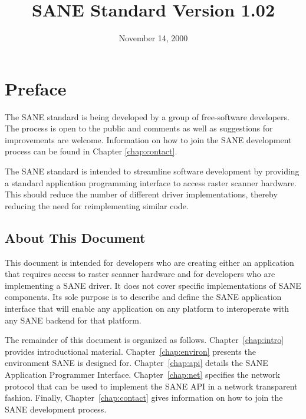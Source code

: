 \documentclass[11pt,DVIps]{report}
\title{\huge SANE Standard Version 1.02}
\author{}
\date{November 14, 2000}
\begin{document}
\newcommand{\filename}[1]{{\tt #1}}
\newcommand{\code}[1]{{\tt #1}}
\newcommand{\var}[1]{{\it #1}}
\newcommand{\defn}[1]{#1\index{#1}}

\begin{latexonly}
  \setcounter{changebargrey}{0}   %
\end{latexonly}

\maketitle
\tableofcontents
\listoffigures
\listoftables


\chapter{Preface}

The SANE standard is being developed by a group of free-software
developers.  The process is open to the public and comments as well as
suggestions for improvements are welcome.  Information on how to join
the SANE development process can be found in Chapter
\ref{chap:contact}.

The SANE standard is intended to streamline software development by
providing a standard application programming interface to access
raster scanner hardware.  This should reduce the number of different
driver implementations, thereby reducing the need for reimplementing
similar code.


\section{About This Document}

This document is intended for developers who are creating either an
application that requires access to raster scanner hardware and for
developers who are implementing a SANE driver.  It does not cover
specific implementations of SANE components.  Its sole purpose is to
describe and define the SANE application interface that will enable
any application on any platform to interoperate with any SANE backend
for that platform.

The remainder of this document is organized as follows.
Chapter~\ref{chap:intro} provides introductional material.
Chapter~\ref{chap:environ} presents the environment SANE is designed
for.  Chapter~\ref{chap:api} details the SANE Application Programmer
Interface.  Chapter~\ref{chap:net} specifies the network protocol that
can be used to implement the SANE API in a network transparent
fashion.  Finally, Chapter~\ref{chap:contact} gives information on how
to join the SANE development process.
\end{document}
